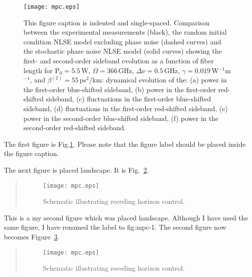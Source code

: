 \begin{figure}
\begin{center}
\texttt{[image: mpc.eps]}
\end{center}
\renewcommand{\baselinestretch}{1}
\small\normalsize
\begin{quote}
\caption[Figure with caption indented]{This figure caption is indented and single-spaced.  Comparison between the experimental measurements \cite{hart1} (black), the random initial condition NLSE model excluding phase noise (dashed curves) and the stochastic phase noise NLSE model (solid curves) showing the first- and second-order sideband evolution as a function of fiber length for P$_{0} = 5.5$\,W, $\Omega = 366$\,GHz, $\Delta\nu = 0.5$\,GHz, $\gamma = 0.019$\,W$^{-1}$m$^{-1}$, and $\beta^{(2)} = 55$\,ps$^2$/km: dynamical evolution of the: (a) power in the first-order blue-shifted sideband, (b) power in the first-order red-shifted sideband, (c) fluctuations in the first-order blue-shifted sideband, (d) fluctuations in the first-order red-shifted sideband, (e) power in the second-order blue-shifted sideband, (f) power in the second-order red-shifted sideband. \label{fig:fig27}}
\end{quote}
\end{figure}
\renewcommand{\baselinestretch}{2}
\small\normalsize

The first figure is Fig.\ref{fig:fig27}.   Please note that the figure label should be placed inside the figure caption.
\newpage

The next figure is placed landscape.  It is Fig.~\ref{fig:mpc}.

\begin{landscape}
\renewcommand{\baselinestretch}{1}
\small\normalsize
\begin{quote}
\begin{figure}
\begin{center}
\texttt{[image: mpc.eps]}
\end{center}
\caption{Schematic illustrating receding horizon control.
\label{fig:mpc} }
\end{figure}
\end{quote}
\renewcommand{\baselinestretch}{2}
\small\normalsize
\end{landscape}

This is a my second figure which was placed landscape.  Although I have used the same figure, I have renamed the label to fig:mpc-1.  The second figure now becomes Figure~\ref{fig:mpc-1}.
\begin{landscape}
\renewcommand{\baselinestretch}{1}
\small\normalsize
\begin{quote}
\begin{figure}
\begin{center}
\texttt{[image: mpc.eps]}
\end{center}
\caption[Figure placed landscape on page]{Schematic illustrating receding horizon control. \label{fig:mpc-1}}
\end{figure}
\end{quote}
\renewcommand{\baselinestretch}{2}
\small\normalsize
\end{landscape}

